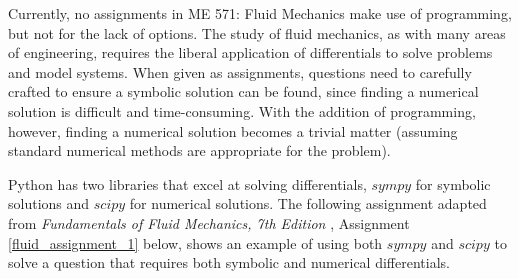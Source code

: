 Currently, no assignments in ME 571: Fluid Mechanics make use of programming, but not for
the lack of options.
The study of fluid mechanics, as with many areas of engineering, requires the liberal 
application of differentials to solve problems and model systems. When given as
assignments, questions need to carefully crafted to ensure a symbolic solution can be found,
since finding a numerical solution is difficult and time-consuming. With the addition of
programming, however, finding a numerical solution becomes a trivial matter (assuming
standard numerical methods are appropriate for the problem).

Python has two libraries that excel at solving differentials, $sympy$ 
\cite{Meurer_SymPy_symbolic_computing_2017} for symbolic solutions 
and $scipy$ \cite{2020SciPy-NMeth} for numerical solutions. The following assignment adapted from 
\textit{Fundamentals of Fluid Mechanics, 7th Edition} \cite{fluid-mechanics}, 
Assignment \ref{fluid_assignment_1} below, shows an example of using both $sympy$ and $scipy$ 
to solve a question that requires both symbolic and numerical differentials. 

\label{fluid_assignment_1}

